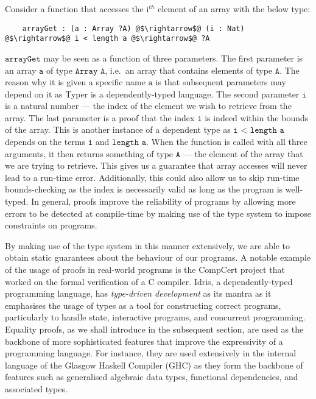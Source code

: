 \documentclass[12pt,twoside,maitrise]{dms}
\theoremstyle{definition}
\numberwithin{equation}{section}
\numberwithin{table}{chapter}
\numberwithin{figure}{chapter}
\newcommand\id[1] {\texttt{#1}}
\newcommand\fn[1] {\texttt{#1}}
\begin{document}
Consider a function that accesses the i$^{th}$ element of an array with the
below type:

\begin{verbatim}
    arrayGet : (a : Array ?A) @$\rightarrow$@ (i : Nat) @$\rightarrow$@ i < length a @$\rightarrow$@ ?A
\end{verbatim}

$\fn{arrayGet}$ may be seen as a function of three parameters.
The first parameter is an array $\fn{a}$ of type $\fn{Array A}$, i.e.\ an array
that contains elements of type $\fn{A}$. The reason why it is given a specific
name $\fn{a}$ is that subsequent parameters may depend on it as Typer is a
dependently-typed language. The second parameter $\fn{i}$ is a natural number
--- the index of the element we wish to retrieve from the array. The last
parameter is a proof that the index $\id{i}$ is indeed within the bounds of the
array.
This is another instance of a dependent type as $\fn{i < length a}$ depends on
the terms $\fn{i}$ and $\fn{length a}$. When the function is called with all
three arguments, it then returns something of type $\fn{A}$ --- the element of
the array that we are trying to retrieve. This gives us a guarantee that array
accesses will never lead to a run-time error. Additionally, this could also
allow us to skip run-time bounds-checking as the index is necessarily valid as
long as the program is well-typed. In general, proofs improve the reliability
of programs by allowing more errors to be detected at compile-time by making
use of the type system to impose constraints on programs.

By making use of the type system in this manner extensively, we are able to obtain
static guarantees about the behaviour of our programs. A notable example of the
usage of proofs in real-world programs is the CompCert project that worked on
the formal verification of a C compiler\cite{Leroy-Compcert-CACM}. Idris, a
dependently-typed programming language, has \emph{type-driven development} as
its mantra as it emphasises the usage of types as a tool for constructing
correct programs, particularly to handle state, interactive programs, and
concurrent programming. Equality proofs, as we shall introduce in the subsequent
section, are used as the backbone of more sophisticated features that improve
the expressivity of a programming language. For instance, they are used
extensively in the internal language of the Glasgow Haskell Compiler (GHC) as
they form the backbone of features such as generalised algebraic data types,
functional dependencies, and associated types\cite{sulzmann2007systemfeq}.
\end{document}
